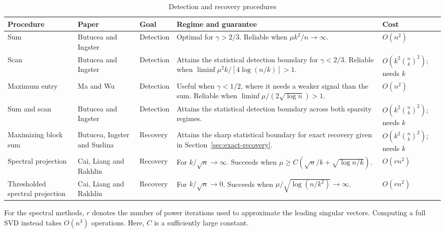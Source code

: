 \documentclass[12pt]{article}
\begin{document}
\begin{table}[!ht]
\centering
\small
\setlength{\tabcolsep}{3.5pt}
\renewcommand{\arraystretch}{1.3}
\caption{Detection and recovery procedures}
\label{tab:methods}
\begin{tabularx}{\textwidth}{@{}
  >{\raggedright\arraybackslash}p{2.15cm}
  >{\raggedright\arraybackslash}p{2.2cm}
  >{\raggedright\arraybackslash}p{2cm}
  >{\raggedright\arraybackslash}X
  >{\raggedright\arraybackslash}p{2.2cm}@{}}
\toprule
\textbf{Procedure} & \textbf{Paper} & \textbf{Goal}
& \textbf{Regime and guarantee} & \textbf{Cost} \\
\midrule
Sum & Butucea and Ingster~\cite{BI2013} & Detection
& Optimal for $\gamma>2/3$. Reliable when
$\mu k^2/n\to\infty$.
& $O(n^2)$ \\
\addlinespace
Scan & Butucea and Ingster~\cite{BI2013} & Detection
& Attains the statistical detection boundary for $\gamma<2/3$.
Reliable when
$\liminf \mu^2k/[4\log(n/k)]>1$.
& $O\left(k^2\binom{n}{k}^2\right)$; needs $k$ \\
\addlinespace
Maximum entry & Ma and Wu~\cite{MW2015} & Detection
& Useful when $\gamma<1/2$, where it needs a weaker signal than the sum.
Reliable when
$\liminf\mu/(2\sqrt{\log n})>1$.
& $O(n^2)$ \\
\addlinespace
Sum and scan & Butucea and Ingster~\cite{BI2013} & Detection
& Attains the statistical detection boundary across both
sparsity regimes.
& $O\left(k^2\binom{n}{k}^2\right)$; needs $k$ \\
\addlinespace
Maximizing block sum & Butucea, Ingster and Suslina~\cite{BIS2015}
& Recovery
& Attains the sharp statistical boundary for exact recovery
given in Section~\ref{sec:exact-recovery}.
& $O\left(k^2\binom{n}{k}^2\right)$; needs $k$ \\
\addlinespace
Spectral projection & Cai, Liang and Rakhlin~\cite{CLR2017}
& Recovery
& For $k/\sqrt n\to\infty$. Succeeds when
$\mu\geq C(\sqrt n/k+\sqrt{\log n/k})$.
& $O(rn^2)$ \\
\addlinespace
Thresholded spectral projection & Cai, Liang and Rakhlin~\cite{CLR2017}
& Recovery
& For $k/\sqrt n\to0$. Succeeds when
$\mu/\sqrt{\log(n/k^2)}\to\infty$.
& $O(rn^2)$ \\
\bottomrule
\end{tabularx}

\medskip
\begin{minipage}{\textwidth}
\footnotesize
 For the spectral methods, $r$ denotes the number
of power iterations used to approximate the leading singular vectors.
Computing a full SVD instead takes $O(n^3)$ operations.
Here, $C$ is a sufficiently large constant. 

\end{minipage}
\end{table}
\end{document}
